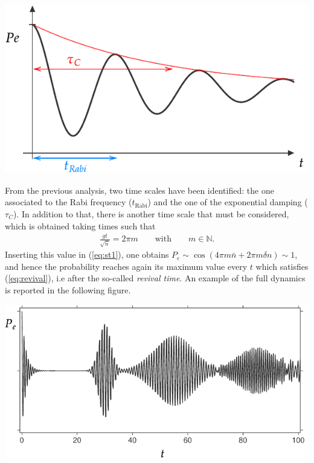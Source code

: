 \begin{center}
\includegraphics[scale=0.6]{img/Rabi_scales_2.pdf}
\end{center}

From the previous analysis, two time scales have been identified: the one associated to the Rabi frequency ($t_\text{Rabi}$) and the one of the exponential damping ($\tau_C$). In addition to that, there is another time scale that must be considered, which is obtained taking times such that 
\begin{align}
    \frac{gt}{\sqrt{\bar{n}}} = 2 \pi m \qquad \text{with} \qquad m \in \mathbb{N}. 
    \label{eq:revival}
\end{align}
Inserting this value in (\ref{eq:st1}), one obtains $P_e \sim \cos{(4 \pi m\bar{n} + 2 \pi m \delta n)} \sim 1$, and hence the probability reaches again its maximum value every $t$ which satisfies (\ref{eq:revival}), i.e after the so-called \textit{revival time}. An example of the full dynamics is reported in the following figure. 

\begin{center}
\includegraphics[scale=0.7]{img/Rabi_scales_1.pdf}
\end{center}


